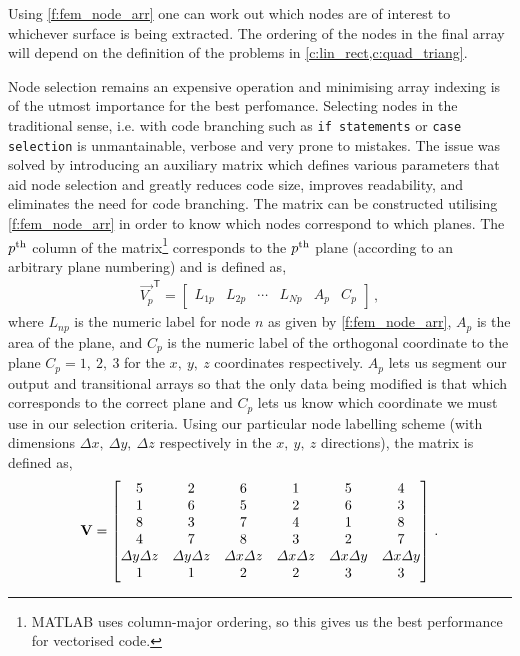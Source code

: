 		Using \cref{f:fem_node_arr} one can work out which nodes are of interest to whichever surface is being extracted. The ordering of the nodes in the final array will depend on the definition of the problems in \cref{c:lin_rect,c:quad_triang}.
		
		Node selection remains an expensive operation and minimising array indexing is of the utmost importance for the best perfomance. Selecting nodes in the traditional sense, i.e. with code branching such as \texttt{if statements} or \texttt{case selection} is unmantainable, verbose and very prone to mistakes. The issue was solved by introducing an auxiliary matrix which defines various parameters that aid node selection and greatly reduces code size, improves readability, and eliminates the need for code branching. The matrix can be constructed utilising \cref{f:fem_node_arr} in order to know which nodes correspond to which  planes. The $ p\textsuperscript{th} $ column of the matrix\footnote{MATLAB uses column-major ordering, so this gives us the best performance for vectorised code.} corresponds to the $ p\textsuperscript{th} $ plane (according to an arbitrary plane numbering) and is defined as,
		\begin{align}\label{e:surf_node_util_vec}
			\vec{V_{p}}^{\mathsf{T}} =
				\begin{bmatrix}
					L_{1p} & L_{2p} & \cdots & L_{Np} & A_{p} & C_{p}
				\end{bmatrix}\,,
		\end{align}	
		where $ L_{np} $ is the numeric label for node $ n $ as given by \cref{f:fem_node_arr}, $ A_{p} $ is the area of the plane, and $ C_{p} $ is the numeric label of the orthogonal coordinate to the plane $ C_{p} = 1, ~2, ~3 $ for the $ x, ~y, ~z $ coordinates respectively. $ A_{p} $ lets us segment our output and transitional arrays so that the only data being modified is that which corresponds to the correct plane and $ C_{p} $ lets us know which coordinate we must use in our selection criteria. Using our particular node labelling scheme (with dimensions $ \Delta x,~ \Delta y,~ \Delta z $ respectively in the $ x,~ y,~ z $ directions), the matrix is defined as,
		\begin{align}\label{e:surf_node_util}
			\mathbf{V} = 
				\begin{bmatrix}
					5 & 2 & 6 & 1 & 5 & 4\\
					1 & 6 & 5 & 2 & 6 & 3\\
					8 & 3 & 7 & 4 & 1 & 8\\
					4 & 7 & 8 & 3 & 2 & 7\\
					\Delta y \Delta z & \Delta y \Delta z & \Delta x \Delta z & \Delta x \Delta z & \Delta x \Delta y & \Delta x \Delta y\\
					1 & 1 & 2 & 2 & 3 & 3
				\end{bmatrix}\,.
		\end{align}
